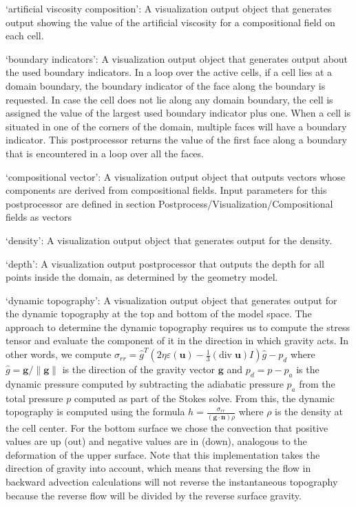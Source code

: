 \begin{itemize}
`artificial viscosity composition': A visualization output object that generates output showing the value of the artificial viscosity for a compositional field on each cell.

`boundary indicators': A visualization output object that generates output about the used boundary indicators. In a loop over the active cells, if a cell lies at a domain boundary, the boundary indicator of the face along the boundary is requested. In case the cell does not lie along any domain boundary, the cell is assigned the value of the largest used boundary indicator plus one. When a cell is situated in one of the corners of the domain, multiple faces will have a boundary indicator. This postprocessor returns the value of the first face along a boundary that is encountered in a loop over all the faces. 

`compositional vector': A visualization output object that outputs vectors whose components are derived from compositional fields. Input parameters for this postprocessor are defined in section Postprocess/Visualization/Compositional fields as vectors

`density': A visualization output object that generates output for the density.

`depth': A visualization output postprocessor that outputs the depth for all points inside the domain, as determined by the geometry model.

`dynamic topography': A visualization output object that generates output for the dynamic topography at the top and bottom of the model space. The approach to determine the dynamic topography requires us to compute the stress tensor and evaluate the component of it in the direction in which gravity acts. In other words, we compute $\sigma_{rr}={\hat g}^T(2 \eta \varepsilon(\mathbf u)-\frac 13 (\textrm{div}\;\mathbf u)I)\hat g - p_d$ where $\hat g = \mathbf g/\|\mathbf g\|$ is the direction of the gravity vector $\mathbf g$ and $p_d=p-p_a$ is the dynamic pressure computed by subtracting the adiabatic pressure $p_a$ from the total pressure $p$ computed as part of the Stokes solve. From this, the dynamic topography is computed using the formula $h=\frac{\sigma_{rr}}{(\mathbf g \cdot \mathbf n)  \rho}$ where $\rho$ is the density at the cell center. For the bottom surface we chose the convection that positive values are up (out) and negative values are in (down), analogous to the deformation of the upper surface. Note that this implementation takes the direction of gravity into account, which means that reversing the flow in backward advection calculations will not reverse the instantaneous topography because the reverse flow will be divided by the reverse surface gravity.


\end{itemize}
